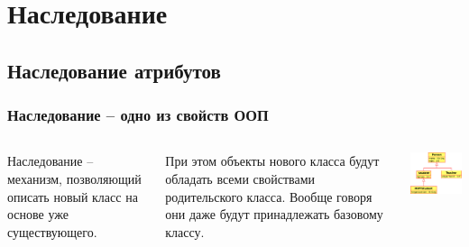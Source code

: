\section{Наследование}

\subsection{Наследование атрибутов}
\begin{frame}[fragile]
	\frametitle{Наследование -- одно из свойств ООП}

	\begin{columns}[c]
	\column{2.3in}
	\begin{Large}
	Наследование -- механизм, позволяющий описать новый класс на основе уже существующего.
	\end{Large}
	\bigskip

	\begin{large}
	При этом объекты нового класса будут обладать всеми свойствами родительского класса. Вообще говоря они даже будут принадлежать базовому классу.
	\end{large}
	\column{2.15in}
	\includegraphics[width=2.2in]{lesson-4-Diagram1.eps}
	\end{columns}
\end{frame}

